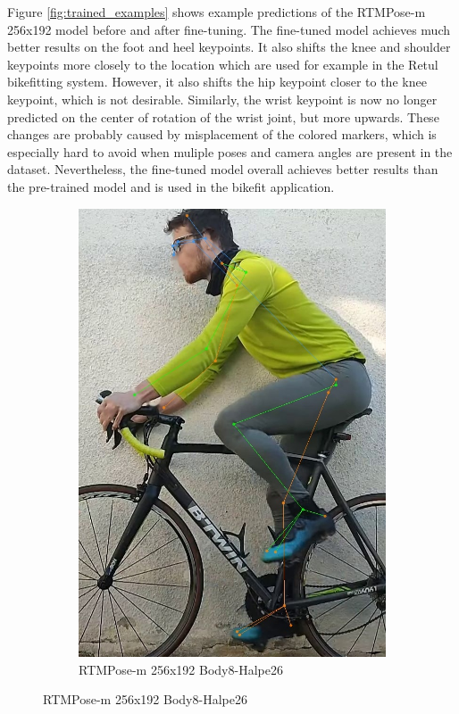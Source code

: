 Figure \ref{fig:trained_examples} shows example predictions of the RTMPose-m 256x192 model before and after fine-tuning. The fine-tuned model achieves much better results on the foot and heel keypoints. It also shifts the knee and shoulder keypoints more closely to the location which are used for example in the Retul bikefitting system. However, it also shifts the hip keypoint closer to the knee keypoint, which is not desirable. Similarly, the wrist keypoint is now no longer predicted on the center of rotation of the wrist joint, but more upwards. These changes are probably caused by misplacement of the colored markers, which is especially hard to avoid when muliple poses and camera angles are present in the dataset. Nevertheless, the fine-tuned model overall achieves better results than the pre-trained model and is used in the bikefit application.
\begin{figure}[htb]
    \centering
    \begin{subfigure}[t]{\imgwidth}
        \centering

        \includegraphics[width=\smallimgwidth]{obrazky-figures/rtmpose-m_8xb512-700e_body8-halpe26-256x192_zlute_196_crop.jpg}
        \caption{RTMPose-m 256x192 Body8-Halpe26}


\end{subfigure}
\end{figure}
